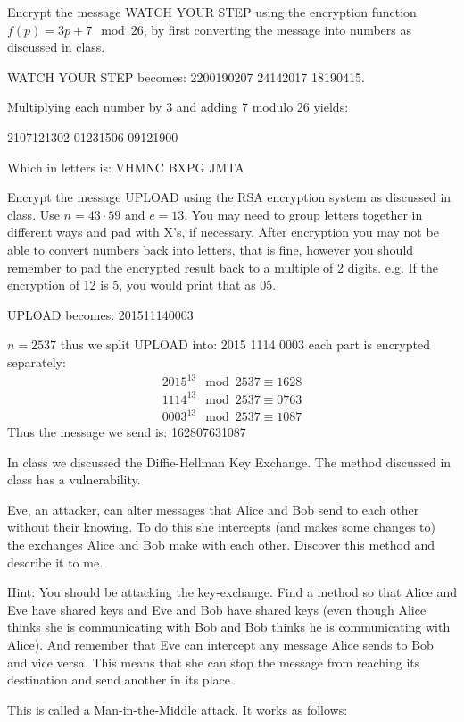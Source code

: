 \documentclass[addpoints]{exam}
\begin{document}
\begin{questions}
  \question[5] Encrypt the message WATCH YOUR STEP using the encryption function
  $f(p) = 3p + 7 \mod 26$, by first converting the message into numbers as
  discussed in class.
  \begin{solution}
    WATCH YOUR STEP becomes: 2200190207 24142017 18190415.

    Multiplying each number by 3 and adding 7 modulo 26 yields:

    2107121302 01231506 09121900

    Which in letters is:
    VHMNC BXPG JMTA
  \end{solution}

  \question[5] Encrypt the message UPLOAD using the RSA encryption system as
  discussed in class. Use $n = 43\cdot 59$ and $e =13$. You may need to group
  letters together in different ways and pad with X's, if necessary. After
  encryption you may not be able to convert numbers back into letters, that is
  fine, however you should remember to pad the encrypted result back to a
  multiple of 2 digits. e.g. If the encryption of 12 is 5, you would print that
  as 05.
   \begin{solution}
        UPLOAD becomes: 201511140003

        $n = 2537$ thus we split UPLOAD into: 2015 1114 0003 each part is
        encrypted separately:
        \begin{align*}
            2015^{13} \mod 2537 \equiv 1628\\
            1114^{13} \mod 2537 \equiv 0763\\
            0003^{13} \mod 2537 \equiv 1087
        \end{align*}
        Thus the message we send is: 162807631087
   \end{solution}

  \question[10] In class we discussed the Diffie-Hellman Key Exchange. The
  method discussed in class has a vulnerability. 

  Eve, an attacker, can alter messages that Alice and Bob send to each other
  without their knowing. To do this she intercepts (and makes some changes to) 
  the exchanges Alice and Bob make with each other. Discover this method and
  describe it to me.

  Hint: You should be attacking the key-exchange. Find a method so that Alice
  and Eve have shared keys and Eve and Bob have shared keys (even though Alice
  thinks she is communicating with Bob and Bob thinks he is communicating with
  Alice). And remember that Eve can intercept any message Alice sends to
  Bob and vice versa. This means that she can stop the message from reaching its
  destination and send another in its place.
  \begin{solution}
    This is called a Man-in-the-Middle attack. It works as follows:


\end{solution}
\end{questions}
\end{document}
